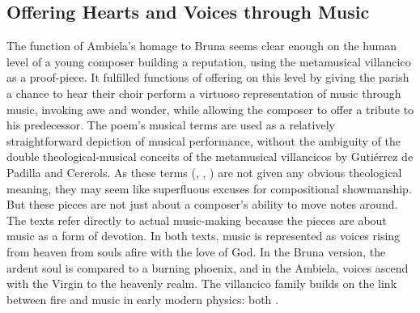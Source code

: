 
\subsection{Offering Hearts and Voices through Music}

The function of Ambiela's homage to Bruna seems clear enough on the human level
of a young composer building a reputation, using the metamusical villancico as
a proof-piece.
It fulfilled functions of offering on this level by giving the parish a chance
to hear their choir perform a virtuoso representation of music through music,
invoking awe and wonder, while allowing the composer to offer a tribute to his
predecessor.
The poem's musical terms are used as a relatively straightforward depiction of
musical performance, without the ambiguity of the double theological-musical
conceits of the metamusical villancicos by Gutiérrez de Padilla and Cererols.
As these terms (, , ) are
not given any obvious theological meaning, they may seem like superfluous
excuses for compositional showmanship.
But these pieces are not just about a composer's ability to move notes around.
The texts refer directly to actual music-making because the pieces are about
music as a form of devotion.
In both texts, music is represented as voices rising from heaven from souls
afire with the love of God.
In the Bruna version, the ardent soul is compared to a burning phoenix, and in
the Ambiela, voices ascend with the Virgin to the heavenly realm.
The villancico family builds on the link between fire and music in early modern
physics: both .


